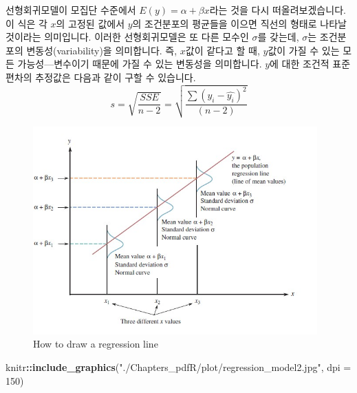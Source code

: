 \documentclass[]{book}
\newenvironment{Shaded}{\begin{snugshade}}{\end{snugshade}}
\newcommand{\DataTypeTok}[1]{\textcolor[rgb]{0.13,0.29,0.53}{#1}}
\newcommand{\DecValTok}[1]{\textcolor[rgb]{0.00,0.00,0.81}{#1}}
\newcommand{\KeywordTok}[1]{\textcolor[rgb]{0.13,0.29,0.53}{\textbf{#1}}}
\newcommand{\NormalTok}[1]{#1}
\newcommand{\OperatorTok}[1]{\textcolor[rgb]{0.81,0.36,0.00}{\textbf{#1}}}
\newcommand{\StringTok}[1]{\textcolor[rgb]{0.31,0.60,0.02}{#1}}
\begin{document}
선형회귀모델이 모집단 수준에서 \(E(y) = \alpha + \beta x\)라는 것을 다시 떠올려보겠습니다. 이 식은 각 \(x\)의 고정된 값에서 \(y\)의 조건분포의 평균들을 이으면 직선의 형태로 나타날 것이라는 의미입니다. 이러한 선형회귀모델은 또 다른 모수인 \(\sigma\)를 갖는데, \(\sigma\)는 조건분포의 변동성(variability)을 의미합니다. 즉, \(x\)값이 같다고 할 때, \(y\)값이 가질 수 있는 모든 가능성---변수이기 때문에 가질 수 있는 변동성을 의미합니다. \(y\)에 대한 조건적 표준편차의 추정값은 다음과 같이 구할 수 있습니다.\[s = \sqrt{\frac{SSE}{n-2}} = \sqrt{\frac{\sum(y_i-\hat{y_i})^2}{(n-2)}}\]

\begin{figure}

{\centering \includegraphics[width=4.3in]{./Chapters_pdfR/plot/regression_model} 

}

\caption{How to draw a regression line}\label{fig:unnamed-chunk-216}
\end{figure}

\begin{Shaded}
\begin{Highlighting}[]
\NormalTok{knitr}\OperatorTok{::}\KeywordTok{include_graphics}\NormalTok{(}\StringTok{"./Chapters_pdfR/plot/regression_model2.jpg"}\NormalTok{, }\DataTypeTok{dpi =} \DecValTok{150}\NormalTok{)}
\end{Highlighting}
\end{Shaded}
\end{document}
